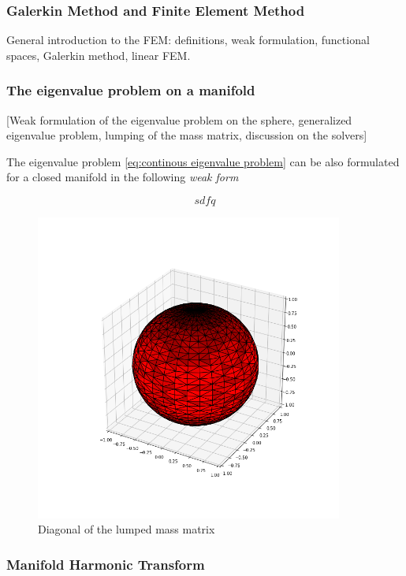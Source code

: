 \subsubsection{Galerkin Method and Finite Element Method}
General introduction to the FEM: definitions, weak formulation, functional spaces, Galerkin method, linear FEM.
\subsubsection{The eigenvalue problem on a manifold}
[Weak formulation of the eigenvalue problem on the sphere, generalized eigenvalue problem, lumping of the mass matrix, discussion on the solvers]

The eigenvalue problem \ref{eq:continous eigenvalue problem} can be also formulated for a closed manifold in the following \textit{weak form}

\begin{equation}\label{eq:weak eigenvalue problem}
sdfq
\end{equation}

\begin{figure}[h]
	\label{fig:Lumping}
	\centering
	\includegraphics[width=0.9\textwidth]{../codes/03.FEM_laplacian/equiangular/normal/img/mass_matrix_diagonal.png}

	\caption{Diagonal of the lumped mass matrix}
\end{figure}
\subsubsection{Manifold Harmonic Transform}



